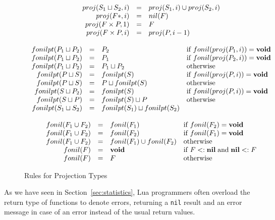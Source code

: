 \documentclass[preprint]{sigplanconf}
\newcommand{\Nil}{\mathbf{nil}}
\newcommand{\subtype}{<:}
\begin{document}
\begin{figure*}[t]
{\[\begin{array}{c}
\begin{array}{rcll}
proj(S_1 \sqcup S_2, i) & = & proj(S_1, i) \cup proj(S_2, i) \\
proj(F{*}, i) & = & nil(F) \\
proj(F \times P, 1) & = & F \\
proj(F \times P, i) & = & proj(P, i-1)
\end{array}\\\\
\begin{array}{rcll}
fonilpt(P_1 \sqcup P_2) & = & P_2 & \mathrm{if} \; fonil(proj(P_1, i)) = {\bf void} \\
fonilpt(P_1 \sqcup P_2) & = & P_1 & \mathrm{if} \; fonil(proj(P_2, i)) = {\bf void} \\
fonilpt(P_1 \sqcup P_2) & = & P_1 \sqcup P_2 & \mathrm{otherwise}\\
fonilpt(P \sqcup S) & = & fonilpt(S) & \mathrm{if} \; fonil(proj(P, i)) = {\bf void} \\
fonilpt(P \sqcup S) & = & P \sqcup fonilpt(S) & \mathrm{otherwise}\\
fonilpt(S \sqcup P_2) & = & fonilpt(S) & \mathrm{if} \; fonil(proj(P, i)) = {\bf void} \\
fonilpt(S \sqcup P) & = & fonilpt(S) \sqcup P & \mathrm{otherwise}\\
fonilpt(S_1 \sqcup S_2) & = & fonilpt(S_1) \sqcup fonilpt(S_2)
\end{array}\\\\
\begin{array}{rcll}
fonil(F_1 \cup F_2) & = & fonil(F_1) & \mathrm{if}\;fonil(F_2) = {\bf void}\\
fonil(F_1 \cup F_2) & = & fonil(F_2) & \mathrm{if}\;fonil(F_1) = {\bf void}\\
fonil(F_1 \cup F_2) & = & fonil(F_1) \cup fonil(F_2) & \mathrm{otherwise}\\
fonil(F) & = & {\bf void} & \mathrm{if} \; F \subtype \Nil \; \mathrm{and} \; \Nil \subtype F\\
fonil(F) & = & F & \mathrm{otherwise}
\end{array}
\end{array}
\]}
\caption{Rules for Projection Types}
\end{figure*}

As we have seen in Section~\ref{sec:statistics}, Lua
programmers often overload the return type of functions
to denote errors, returning a {\tt nil} result and
an error message in case of an error instead of the
usual return values.
\end{document}
